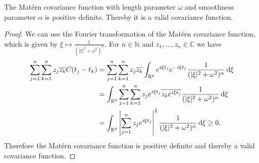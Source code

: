 \begin{proposition}
    The Matérn covariance function with length parameter $\omega$ and smoothness parameter $\alpha$ is positive definite.
    Thereby it is a valid covariance function.
\end{proposition}
\begin{proof}
    We can use the Fourier transformation of the Matérn covariance function, which is given by \( \xi \mapsto \frac{1}{(\lvert \xi \rvert^2+\omega^2)^{\alpha}} \).
    For $n \in \mathbb{N}$ and $z_{1}, \dots ,z_{n} \in \mathbb{C}$ we have
\begin{align*}
    \sum_{j=1}^{n} \sum_{k=1}^{n} z_{j}\overline{z_{k}} C(t_{j} -t_{k}) &=
    \sum_{j=1}^{n} \sum_{k=1}^{n} z_{j}\overline{z_{k}} \int_{\mathbb{R}^{d}} e^{i \xi t_{j}} e^{-i \xi t_{j}} \frac{1}{(\lvert \xi \rvert^2+\omega^2)^{\alpha}}\dx[\xi]\\
    &=\int_{\mathbb{R}^{d}}  \sum_{j=1}^{n} \sum_{k=1}^{n} z_{j} e^{i \xi t_{j}} \overline{z_{k}e^{i \xi t_{j}}}\frac{1}{(\lvert \xi \rvert^2+\omega^2)^{\alpha}}\dx[\xi]
    \\
    &= \int_{\mathbb{R}^{d}} \left| \sum_{j=1}^{n}  z_{j} e^{i \xi t_{j}} \right|^2 \frac{1}{(\lvert \xi \rvert^2+\omega^2)^{\alpha}}\dx[\xi] \geq 0.
\end{align*}
Therefore the Matérn covariance function is positive definite and thereby a valid covariance function.
\end{proof}
